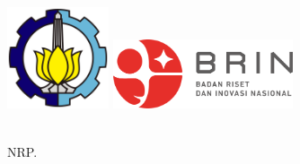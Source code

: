 {
\setcounter{page}{1}
    
\begin{flushleft}
        \includegraphics[width=30mm]{./halaman-depan/00-Logo-ITS.png}
        \hspace{10mm}
        \includegraphics[width=53mm]{./gambar/brin.png}
    \end{flushleft}
    
    \vspace{24mm}
    
    \noindent {\large\textsf{\color{black}{%
    \textbf{\kodeTA} %
    }}}
    
    \vspace{4mm}
    
    \begin{flushleft}
        \noindent {\Large\textsf{\color{black}
        {\MakeUppercase{\judulTA}}}}
    \end{flushleft}
    
    \vspace{40mm}
    
    {\noindent\textsf{\color{black}
    {\MakeUppercase{\large\textbf{\namaMahasiswa}\\[0mm]
    {NRP. \noIndukMahasiswa}}}}}
    
    \vspace{10mm}
    
    {\noindent\textsf{}}
    
}
